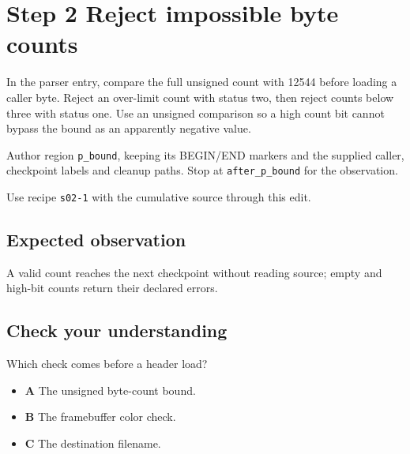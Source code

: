 \section{Step 2 Reject impossible byte counts}\label{ppm-s02}

In the parser entry, compare the full unsigned count with 12544 before loading a caller byte. Reject an over-limit count with status two, then reject counts below three with status one. Use an unsigned comparison so a high count bit cannot bypass the bound as an apparently negative value.

Author region \texttt{p\_bound}, keeping its BEGIN/END markers and the supplied caller, checkpoint labels and cleanup paths. Stop at \texttt{after\_p\_bound} for the observation.

Use recipe \texttt{s02-1} with the cumulative source through this edit.

\subsection{Expected observation}
A valid count reaches the next checkpoint without reading source; empty and high-bit counts return their declared errors.

\subsection{Check your understanding}
Which check comes before a header load?

\begin{itemize}
  \item \textbf{A} The unsigned byte-count bound.
  \item \textbf{B} The framebuffer color check.
  \item \textbf{C} The destination filename.
\end{itemize}
